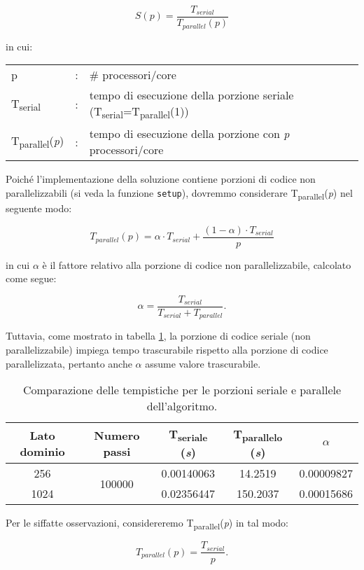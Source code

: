 \[
    S(p) = \frac{T_{serial}}{T_{parallel}(p)}
\]

in cui:
\begin{table}[ht]
\begin{tabular}{lll}
    p & : & \# processori/core\\
    T\textsubscript{serial}& : & tempo di esecuzione della porzione seriale
    (T\textsubscript{serial}=T\textsubscript{parallel}(1))\\
    T\textsubscript{parallel}(\textit{p}) & : & tempo di esecuzione della porzione con
    \textit{p} processori/core
\end{tabular}
\end{table}

Poiché l'implementazione della soluzione contiene porzioni di codice non
parallelizzabili (si veda la funzione \texttt{setup}), dovremmo considerare
T\textsubscript{parallel}(\textit{p}) nel seguente modo:

\[ 
T_{parallel}(p) = \alpha \cdot T_{serial} +  \frac{(1 - \alpha) \cdot
T_{serial}}{p}
\]

in cui $\alpha$ è il fattore relativo alla porzione di codice non
parallelizzabile, calcolato come segue:

\[ 
\alpha = \frac{T_{serial}}{T_{serial} + T_{parallel}}.
\]

Tuttavia, come mostrato in tabella \ref{tab:alpha}, la porzione di codice
seriale (non parallelizzabile) impiega tempo trascurabile rispetto alla porzione
di codice parallelizzata, pertanto anche $\alpha$ assume valore trascurabile.

\begin{table}[ht]
\centering
\begin{tabular}{ccccc}
\toprule
 Lato dominio & Numero passi & T\textsubscript{seriale} (\textit{s}) &
 T\textsubscript{parallelo} (\textit{s})& $\alpha$ \\
 \midrule
    256 & \multirow{2}{*}{100000} & 0.00140063 & 14.2519 & 0.00009827 \\
    1024 & & 0.02356447 & 150.2037 & 0.00015686 \\
\bottomrule
\end{tabular}
\caption{Comparazione delle tempistiche per le porzioni seriale e parallele
dell'algoritmo.\label{tab:alpha}}
\end{table}

Per le siffatte osservazioni, considereremo
T\textsubscript{parallel}(\textit{p}) in tal modo:

\[
T_{parallel}(p) = \frac{T_{serial}}{p}.
\]

